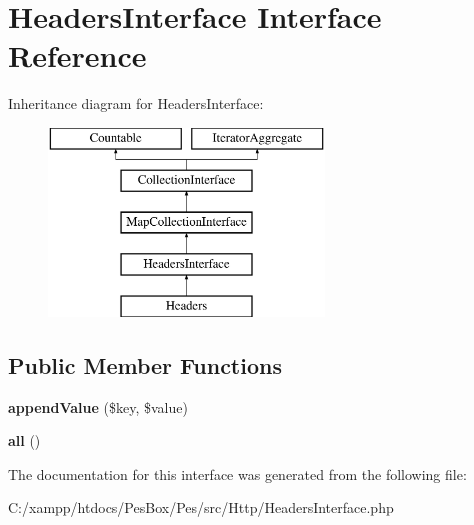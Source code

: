\hypertarget{interface_pes_1_1_http_1_1_headers_interface}{}\section{Headers\+Interface Interface Reference}
\label{interface_pes_1_1_http_1_1_headers_interface}
Inheritance diagram for Headers\+Interface\+:\begin{figure}[H]
\begin{center}
\leavevmode
\includegraphics[height=5.000000cm]{interface_pes_1_1_http_1_1_headers_interface}
\end{center}
\end{figure}
\subsection*{Public Member Functions}
\begin{DoxyCompactItemize}
\item 
\mbox{\label{interface_pes_1_1_http_1_1_headers_interface_a03fe29986ea8750c4f56dedea98d2bd6}} 
{\bfseries append\+Value} (\$key, \$value)
\item 
\mbox{\label{interface_pes_1_1_http_1_1_headers_interface_af9d14e4ae6227970ad603987781573ca}} 
{\bfseries all} ()
\end{DoxyCompactItemize}


The documentation for this interface was generated from the following file\+:\begin{DoxyCompactItemize}
\item 
C\+:/xampp/htdocs/\+Pes\+Box/\+Pes/src/\+Http/Headers\+Interface.\+php\end{DoxyCompactItemize}
